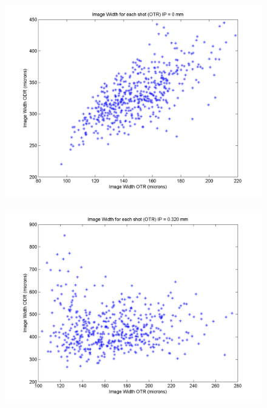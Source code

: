 \documentclass[12pt]{article}
\begin{document}
\begin{figure}
\begin{center}
\includegraphics[scale=0.5]{Figures/ImageWidth_OTRODR_0.PNG}
\caption{}
\end{center}
\end{figure}

\begin{figure}
\begin{center}
\includegraphics[scale=0.5]{Figures/ImageWidth_OTRODR_320.PNG}
\caption{}
\end{center}
\end{figure}
\end{document}
